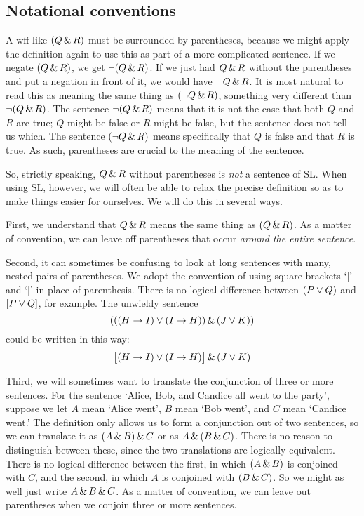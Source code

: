 

\subsection{Notational conventions}
\label{SLconventions}
A wff like $(Q \,\&\, R)$ must be surrounded by parentheses, because we might apply the definition again to use this as part of a more complicated sentence. If we negate $(Q \,\&\, R)$, we get $\neg(Q \,\&\, R)$. If we just had $Q \,\&\, R$ without the parentheses and put a negation in front of it, we would have $\neg Q \,\&\, R$. It is most natural to read this as meaning the same thing as $(\neg Q \,\&\, R)$, something very different than $\neg(Q\,\&\, R)$. The sentence $\neg(Q \,\&\, R)$ means that it is not the case that both $Q$ and $R$ are true; $Q$ might be false or $R$ might be false, but the sentence does not tell us which. The sentence $(\neg Q \,\&\, R)$ means specifically that $Q$ is false and that $R$ is true. As such, parentheses are crucial to the meaning of the sentence.

So, strictly speaking, $Q \,\&\, R$ without parentheses is \emph{not} a sentence of SL. When using SL, however, we will often be able to relax the precise definition so as to make things easier for ourselves. We will do this in several ways.

First,  we understand that $Q \,\&\, R$ means the same thing as $(Q \,\&\, R)$. As a matter of convention, we can leave off parentheses that occur \emph{around the entire sentence}.

Second, it can sometimes be confusing to look at long sentences with many, nested pairs of parentheses. We adopt the convention of using square brackets `[' and `]' in place of parenthesis. There is no logical difference between $(P\vee Q)$ and $[P\vee Q]$, for example. The unwieldy sentence
$$(((H \rightarrow I) \vee (I \rightarrow H)) \,\&\, (J \vee K))$$
could be written in this way:
$$\bigl[(H \rightarrow I) \vee (I \rightarrow H)\bigr] \,\&\, (J \vee K)$$


Third, we will sometimes want to translate the conjunction of three or more sentences. For the sentence `Alice, Bob, and Candice all went to the party', suppose we let $A$ mean `Alice went', $B$ mean `Bob went', and $C$ mean `Candice went.' The definition only allows us to form a conjunction out of two sentences, so we can translate it as $(A \,\&\, B) \,\&\, C$ or as $A \,\&\, (B \,\&\, C)$. There is no reason to distinguish between these, since the two translations are logically equivalent. There is no logical difference between the first, in which $(A \,\&\, B)$ is conjoined with $C$, and the second, in which $A$ is conjoined with $(B \,\&\, C)$.  So we might as well just write $A \,\&\, B \,\&\, C$. As a matter of convention, we can leave out parentheses when we conjoin three or more sentences.

